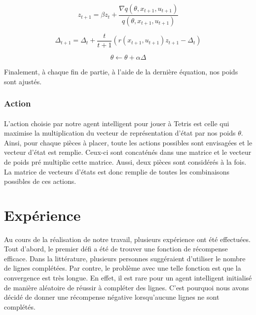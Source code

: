\documentclass[a4paper, 12pt]{article} %
\begin{document}
	    \begin{equation}
	        z_{t+1} = \beta z_{t} + \frac{\nabla q(\theta, x_{t+1}, u_{t+1})}{q(\theta, x_{t+1}, u_{t+1})}
	    \end{equation}

	    \begin{equation}
	    	\Delta_{t+1} = \Delta_{t} + \frac{t}{t+1} (r(x_{t+1}, u_{t+1})z_{t+1} - \Delta_{t})
	    \end{equation}

	    \begin{equation}
	        \theta \leftarrow  \theta + \alpha \Delta
	    \end{equation}

	    Finalement, à chaque fin de partie, à l'aide de la dernière équation, nos poids sont ajustés.

	\subsubsection{Action}
    	    \paragraph{}
	    L'action choisie par notre agent intelligent pour jouer à Tetris est celle qui maximise la multiplication
	    du vecteur de représentation d'état par nos poids $\theta$. Ainsi, pour chaque pièces à placer, toute les actions
	    possibles sont envisagées et le vecteur d'état est remplie. Ceux-ci sont concaténés dans une matrice et le vecteur 
	    de poids pré multiplie cette matrice. Aussi, deux pièces sont considérés à la fois. La matrice de vecteurs d'états
	    est donc remplie de toutes les combinaisons possibles de ces actions.

\section{Expérience}
    \paragraph{}
    Au cours de la réalisation de notre travail, plusieurs expérience ont été effectuées. Tout d'abord, le premier défi a été
    de trouver une fonction de récompense efficace. Dans la littérature, plusieurs personnes suggéraient d'utiliser le nombre
    de lignes complétées. Par contre, le problème avec une telle fonction est que la convergence est très longue. En effet,
    il est rare pour un agent intelligent initialisé de manière aléatoire de réussir à compléter des lignes. C'est pourquoi
    nous avons décidé de donner une récompense négative lorsqu'aucune lignes ne sont complétés.
\end{document}
